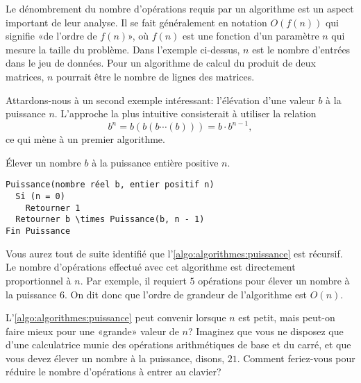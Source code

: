 Le dénombrement du nombre d'opérations requis par un algorithme est un
aspect important de leur analyse. Il se fait généralement en notation
$O(f(n))$ qui signifie «de l'ordre de $f(n)$», où $f(n)$ est une
fonction d'un paramètre $n$ qui mesure la taille du problème. Dans
l'exemple ci-dessus, $n$ est le nombre d'entrées dans le jeu de
données. Pour un algorithme de calcul du produit de deux matrices, $n$
pourrait être le nombre de lignes des matrices.

Attardons-nous à un second exemple intéressant: l'élévation d'une
valeur $b$ à la puissance $n$. L'approche la plus intuitive
consisterait à utiliser la relation
\begin{equation*}
  b^n = b (b (b \cdots (b))) = b \cdot b^{n - 1},
\end{equation*}
ce qui mène à un premier algorithme.

\begin{algorithme}
  \label{algo:algorithmes:puissance}
  Élever un nombre $b$ à la puissance entière positive $n$.
  \begin{Schunk}
\begin{Verbatim}[commandchars=\\\{\}]
Puissance(nombre réel b, entier positif n)
  Si (n = 0)
    Retourner 1
  Retourner b \times Puissance(b, n - 1)
Fin Puissance
\end{Verbatim}
  \end{Schunk}
\end{algorithme}

Vous aurez tout de suite identifié que
l'\autoref{algo:algorithmes:puissance} est récursif. Le nombre
d'opérations effectué avec cet algorithme est directement
proportionnel à $n$. Par exemple, il requiert $5$ opérations pour
élever un nombre à la puissance $6$. On dit donc que l'ordre de
grandeur de l'algorithme est $O(n)$.

L'\autoref{algo:algorithmes:puissance} peut convenir lorsque $n$ est
petit, mais peut-on faire mieux pour une «grande» valeur de $n$?
Imaginez que vous ne disposez que d'une calculatrice munie des
opérations arithmétiques de base et du carré, et que vous devez élever
un nombre à la puissance, disons, $21$. Comment feriez-vous pour
réduire le nombre d'opérations à entrer au clavier?


